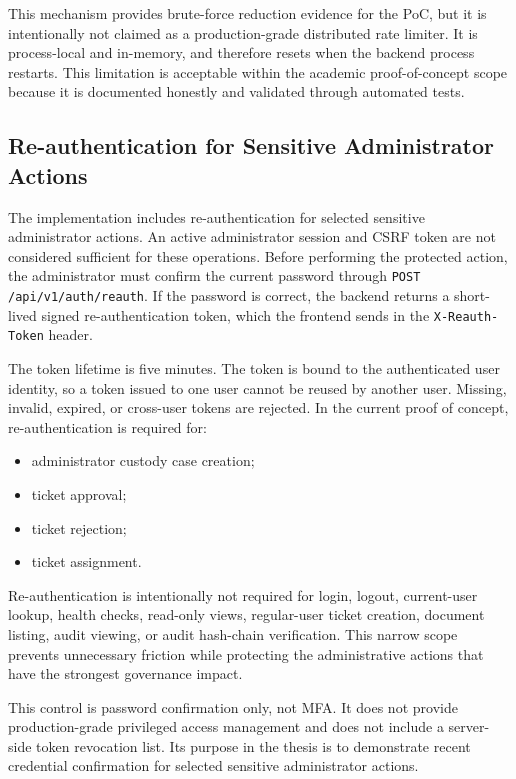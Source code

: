 \documentclass[12pt,a4paper]{report}
\begin{document}
This mechanism provides brute-force reduction evidence for the PoC, but it is intentionally not claimed as a production-grade distributed rate limiter. It is process-local and in-memory, and therefore resets when the backend process restarts. This limitation is acceptable within the academic proof-of-concept scope because it is documented honestly and validated through automated tests.

\subsection{Re-authentication for Sensitive Administrator Actions}

The implementation includes re-authentication for selected sensitive administrator actions. An active administrator session and CSRF token are not considered sufficient for these operations. Before performing the protected action, the administrator must confirm the current password through \texttt{POST /api/v1/auth/reauth}. If the password is correct, the backend returns a short-lived signed re-authentication token, which the frontend sends in the \texttt{X-Reauth-Token} header.

The token lifetime is five minutes. The token is bound to the authenticated user identity, so a token issued to one user cannot be reused by another user. Missing, invalid, expired, or cross-user tokens are rejected. In the current proof of concept, re-authentication is required for:

\begin{itemize}
    \item administrator custody case creation;
    \item ticket approval;
    \item ticket rejection;
    \item ticket assignment.
\end{itemize}

Re-authentication is intentionally not required for login, logout, current-user lookup, health checks, read-only views, regular-user ticket creation, document listing, audit viewing, or audit hash-chain verification. This narrow scope prevents unnecessary friction while protecting the administrative actions that have the strongest governance impact.

This control is password confirmation only, not MFA. It does not provide production-grade privileged access management and does not include a server-side token revocation list. Its purpose in the thesis is to demonstrate recent credential confirmation for selected sensitive administrator actions.
\end{document}
